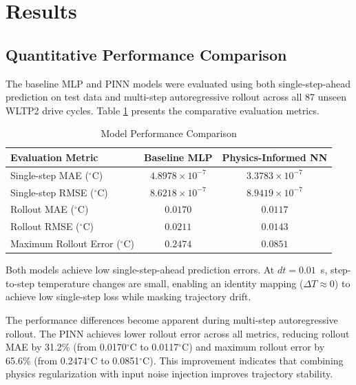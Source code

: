 \section{Results}

\subsection{Quantitative Performance Comparison}
The baseline MLP and PINN models were evaluated using both single-step-ahead prediction on test data and multi-step autoregressive rollout across all 87 unseen WLTP2 drive cycles. Table \ref{tab:comparison} presents the comparative evaluation metrics.

\begin{table}[h]
\centering
\caption{Model Performance Comparison}
\label{tab:comparison}
\begin{tabular}{lcc}
\toprule
Evaluation Metric & Baseline MLP & Physics-Informed NN \\
\midrule
Single-step MAE ($^\circ$C) & $4.8978 \times 10^{-7}$ & $3.3783 \times 10^{-7}$ \\
Single-step RMSE ($^\circ$C) & $8.6218 \times 10^{-7}$ & $8.9419 \times 10^{-7}$ \\
Rollout MAE ($^\circ$C) & $0.0170$ & $0.0117$ \\
Rollout RMSE ($^\circ$C) & $0.0211$ & $0.0143$ \\
Maximum Rollout Error ($^\circ$C) & $0.2474$ & $0.0851$ \\
\bottomrule
\end{tabular}
\end{table}

Both models achieve low single-step-ahead prediction errors. At $dt = 0.01$~s, step-to-step temperature changes are small, enabling an identity mapping ($\Delta T \approx 0$) to achieve low single-step loss while masking trajectory drift.

The performance differences become apparent during multi-step autoregressive rollout. The PINN achieves lower rollout error across all metrics, reducing rollout MAE by 31.2\% (from 0.0170$^\circ$C to 0.0117$^\circ$C) and maximum rollout error by 65.6\% (from 0.2474$^\circ$C to 0.0851$^\circ$C). This improvement indicates that combining physics regularization with input noise injection improves trajectory stability.

